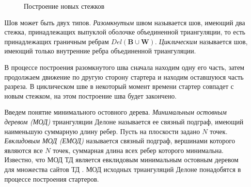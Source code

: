 \documentclass[12pt]{article}
\begin{document}
\begin{figure}[htb!]
	\begin{minipage}[h]{0.49\linewidth}
	\end{minipage}
	\hfill
	\begin{minipage}[h]{0.49\linewidth}
	\end{minipage}
	\caption{Построение новых стежков}
	\label{pic:dir}
\end{figure}

Шов может быть двух типов.
{\itshape Разомкнутым} швом называется шов, имеющий два стежка, принадлежащих выпуклой оболочке объединенной триангуляции,
то есть принадлежащих граничным ребрам $Del(\textbf{B} \cup \textbf{W})$.
{\itshape Циклическим} называется шов, имеющий только внутренние ребра объединенной триангуляции.

В процессе построения разомкнутого шва сначала находим одну его часть,
затем продолжаем движение по другую сторону стартера и находим оставшуюся часть разреза.
В циклическом шве в некоторый момент времени стартер совпадет с новым стежком,
на этом построение шва будет закончено.

Введем понятие минимального остовного дерева.
{\itshape Минимальным остовным деревом (МОД)} триангуляции Делоне называется ее связный подграф,
имеющий наименьшую суммарную длину ребер.
Пусть на плоскости задано $N$ точек.
{\itshape Евклидовым МОД (ЕМОД)} называется связный подграф,
вершинами которого являются все $N$ точек, суммарная длина всех ребер которого минимальна.
Известно, что МОД ТД является евклидовым минимальным остовным деревом для множества сайтов ТД \cite[стр. 229, 277]{Preparata}.
МОД исходных триангуляций Делоне понадобятся в процессе построения стартеров.
\end{document}

